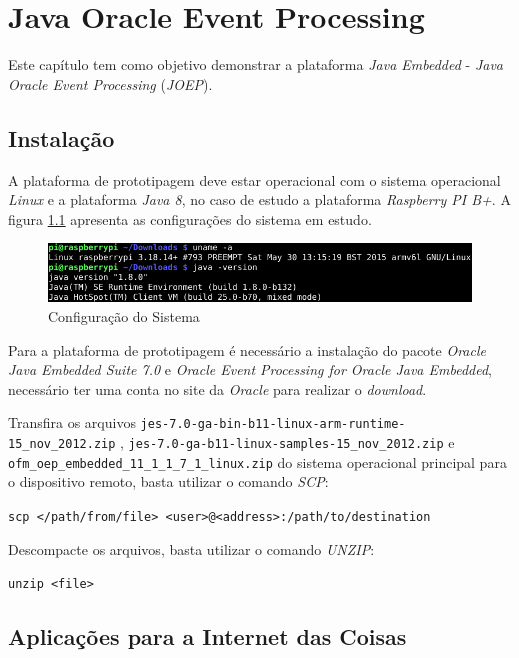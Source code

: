 %

\chapter{Java Oracle Event Processing}

Este capítulo tem como objetivo demonstrar a plataforma \textit{Java Embedded} 
- \textit{Java Oracle Event Processing} (\textit{JOEP}).

\section{Instalação}

A plataforma de prototipagem deve estar operacional com o sistema operacional 
\textit{Linux} e a plataforma \textit{Java 8}, no caso de estudo a plataforma 
\textit{Raspberry PI B+}. A figura \ref{fig:joep/configuracao} apresenta as 
configurações do sistema em estudo.

\begin{figure}[H]
    \centering
    \includegraphics[width=0.7\linewidth]{figuras/java/configuracao}
    \caption{Configuração do Sistema}
    \label{fig:joep/configuracao}
\end{figure}

Para a plataforma de prototipagem é necessário a instalação do pacote 
\textit{Oracle Java Embedded Suite 7.0} e \textit{Oracle Event Processing for 
Oracle Java Embedded}, necessário ter uma conta no site da 
\textit{Oracle} para realizar o \textit{download}.

Transfira os arquivos \newline
\verb|jes-7.0-ga-bin-b11-linux-arm-runtime-15_nov_2012.zip|
, \newline
\verb|jes-7.0-ga-b11-linux-samples-15_nov_2012.zip|
e \newline
\verb|ofm_oep_embedded_11_1_1_7_1_linux.zip|
 do sistema operacional principal para o dispositivo remoto, basta utilizar o 
comando \textit{SCP}:

\verb|scp </path/from/file> <user>@<address>:/path/to/destination|

Descompacte os arquivos, basta utilizar o comando \textit{UNZIP}:

\verb|unzip <file>|

\section{Aplicações para a Internet das Coisas}

